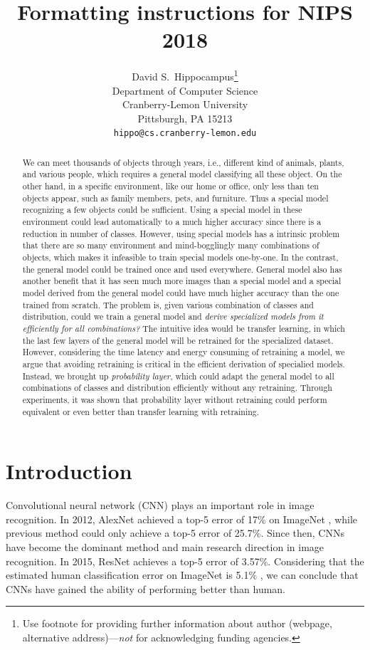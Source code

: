 \documentclass{article}
\title{Formatting instructions for NIPS 2018}
\author{
  David S.~Hippocampus\thanks{Use footnote for providing further
    information about author (webpage, alternative
    address)---\emph{not} for acknowledging funding agencies.} \\
  Department of Computer Science\\
  Cranberry-Lemon University\\
  Pittsburgh, PA 15213 \\
  \texttt{hippo@cs.cranberry-lemon.edu} \\
}
\begin{document}

\maketitle


\begin{abstract}
  We can meet thousands of objects through years, i.e., different kind of animals, plants, and various people, which requires a general model classifying all these object. On the other hand, in a specific environment, like our home or office, only less than ten objects appear, such as family members, pets, and furniture. Thus a special model recognizing a few objects could be sufficient. Using a special model in these environment could lead automatically to a much higher accuracy since there is a reduction in number of classes. However, using special models has a intrinsic problem that there are so many environment and mind-bogglingly many combinations of objects, which makes it infeasible to train special models one-by-one. In the contrast, the general model could be trained once and used everywhere. General model also has another benefit that it has seen much more images than a special model and a special model derived from the general model could have much higher accuracy than the one trained from scratch. The problem is, given various combination of classes and distribution, could we train a general model and \textit{derive specialized models from it efficiently for all combinations?} The intuitive idea would be transfer learning, in which the last few layers of the general model will be retrained for the specialized dataset. However, considering the time latency and energy consuming of retraining a model, we argue that avoiding retraining is critical in the efficient derivation of specialied models. Instead, we brought up \textit{probability layer}, which could adapt the general model to all combinations of classes and distribution efficiently without any retraining. Through experiments, it was shown that probability layer without retraining could perform equivalent or even better than transfer learning with retraining.
\end{abstract}


\section{Introduction}
Convolutional neural network (CNN) plays an important role in image recognition. In 2012, AlexNet \cite{krizhevsky2012imagenet} achieved a top-5 error of 17\% on ImageNet \cite{deng2009imagenet}, while previous method could only achieve a top-5 error of 25.7\%. Since then, CNNs have become the dominant method and main research direction in image recognition. In 2015, ResNet \cite{he2016deep} achieves a top-5 error of 3.57\%. Considering that the estimated human classification error on ImageNet is 5.1\% \cite{russakovsky2015imagenet}, we can conclude that CNNs have gained the ability of performing better than human. 
\end{document}
